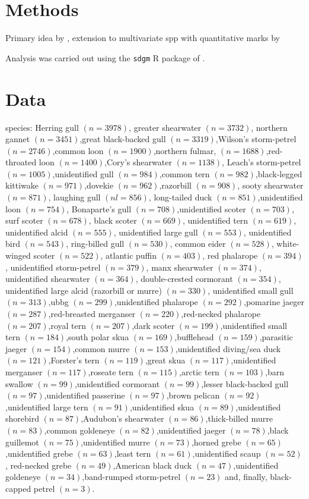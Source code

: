 \documentclass{statsoc}
\begin{document}
\section{Methods}

Primary idea by \cite{Eckardt2016}, extension to multivariate spp with quantitative marks by \cite{Eckardt2016b}

Analysis was carried out using the \texttt{sdgm} R package of \cite{Eckardt2016a}.

\section{Data}

species: 
Herring gull $(n=3978)$, greater shearwater $(n=3732)$,
northern gannet $(n=3451)$,great black-backed gull $(n=3319)$,Wilson's storm-petrel $(n=2746)$,common loon $(n=1900)$,northern fulmar, $(n=1688)$,red-throated loon $(n=1400)$,Cory's shearwater $(n=1138)$, Leach's storm-petrel $(n=1005)$,unidentified gull $(n=984)$,common tern $(n=982)$,black-legged kittiwake $(n=971)$,dovekie $(n=962)$,razorbill $(n=908)$, sooty shearwater $(n=871)$, laughing gull $(nl=856)$, long-tailed duck $(n=851)$,unidentified loon $(n=754)$, Bonaparte's gull $(n=708)$,unidentified scoter $(n=703)$, surf scoter $(n=678)$,
black scoter $(n=669)$, unidentified tern $(n=619)$,
unidentified alcid $(n=555)$, unidentified large gull $(n=553)$, unidentified bird $(n=543)$, ring-billed gull $(n=530)$, common eider $(n=528)$, white-winged scoter $(n=522)$, atlantic puffin $(n=403)$, red phalarope $(n=394)$, unidentified storm-petrel $(n=379)$, manx shearwater $(n=374)$, unidentified shearwater $(n=364)$, double-crested cormorant $(n=354)$, unidentified large alcid (razorbill or murre) $(n=330)$, unidentified small gull $(n=313)$,ubbg $(n=299)$,unidentified phalarope $(n=292)$,pomarine jaeger $(n=287)$,red-breasted merganser $(n=220)$,red-necked phalarope $(n=207)$,royal tern $(n=207)$,dark scoter $(n=199)$,unidentified small tern $(n=184)$,south polar skua $(n=169)$,bufflehead $(n=159)$,parasitic jaeger $(n=154)$,common murre $(n=153)$,unidentified diving/sea duck $(n=121)$,Forster's tern $(n=119)$,great skua $(n=117)$,unidentified merganser $(n=117)$,roseate tern $(n=115)$,arctic tern $(n=103)$,barn swallow $(n=99)$,unidentified cormorant $(n=99)$,lesser black-backed gull $(n=97)$,unidentified passerine $(n=97)$,brown pelican $(n=92)$,unidentified large tern $(n=91)$,unidentified skua $(n=89)$,unidentified shorebird $(n=87)$,Audubon's shearwater $(n=86)$,thick-billed murre $(n=83)$,common goldeneye $(n=82)$,unidentified jaeger $(n=78)$,black guillemot $(n=75)$,unidentified murre $(n=73)$,horned grebe $(n=65)$,unidentified grebe $(n=63)$,least tern $(n=61)$,unidentified scaup $(n=52)$,
red-necked grebe $(n=49)$,American black duck $(n=47)$,unidentified goldeneye $(n=34)$,band-rumped storm-petrel $(n=23)$ and, finally,
black-capped petrel $(n=3)$.
\end{document}
